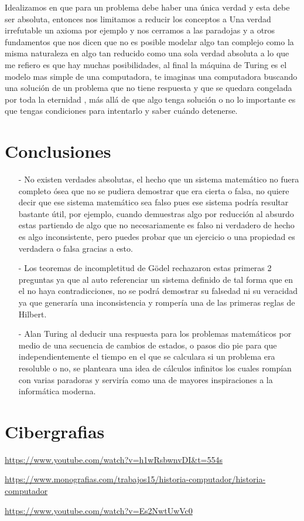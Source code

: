 \documentclass{article}
\begin{document}
\vspace{2mm}
Idealizamos en que para un problema debe haber una única verdad y esta debe ser absoluta, entonces nos limitamos a reducir los conceptos a Una verdad irrefutable un axioma por ejemplo y nos cerramos a las paradojas y a otros fundamentos que nos dicen que no es posible modelar algo tan complejo como la misma naturaleza en algo tan reducido como una sola verdad absoluta a lo que me refiero es que hay muchas posibilidades, al final la máquina de Turing es el modelo mas simple de una computadora, te imaginas una computadora buscando una solución de un problema que no tiene respuesta y que se quedara congelada por toda la eternidad , más allá de que algo tenga solución o no lo importante es que tengas condiciones para intentarlo y saber cuándo detenerse. 

\section{Conclusiones}
\begin{enumerate}
    \item [-] No existen verdades absolutas, el hecho que un sistema matemático no fuera completo ósea que no se pudiera demostrar que era cierta o falsa, no quiere decir que ese sistema matemático sea falso pues ese sistema podría resultar bastante útil, por ejemplo, cuando demuestras algo por reducción al absurdo estas partiendo de algo que no necesariamente es falso ni verdadero de hecho es algo inconsistente, pero puedes probar que un ejercicio o una propiedad es verdadera o falsa gracias a esto.
    \item [-]Los teoremas de incompletitud de Gödel rechazaron estas primeras 2 preguntas ya que al auto referenciar un sistema definido de tal forma que en el no haya contradicciones, no se podrá demostrar su falsedad ni su veracidad ya que generaría una inconsistencia y rompería una de las primeras reglas de Hilbert.
    \item [-]Alan Turing al deducir una respuesta para los problemas matemáticos por medio de una secuencia de cambios de estados, o pasos dio pie para que independientemente el tiempo en el que se calculara si un problema era resoluble o no, se planteara una idea de cálculos infinitos los cuales rompían con varias paradoras y serviría como una de mayores inspiraciones a la informática moderna. 
\end{enumerate}
\section{Cibergrafias}
\url{https://www.youtube.com/watch?v=h1wRsbwnvDI&t=554s}
\par
\vspace{2mm}
\url{https://www.monografias.com/trabajos15/historia-computador/historia-computador}
\par
\vspace{2mm}
\url{https://www.youtube.com/watch?v=Es2NwtUwVc0}
\end{document}
